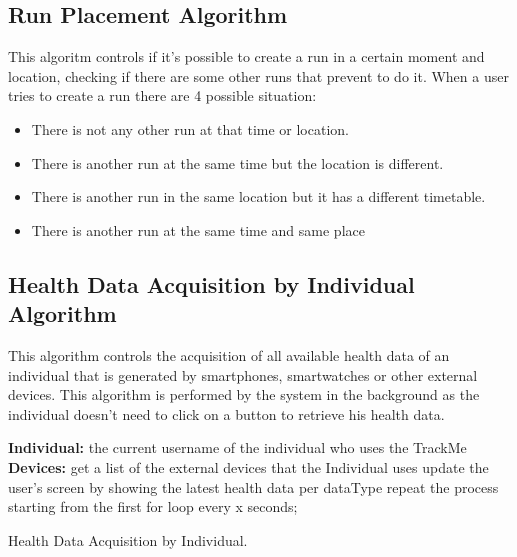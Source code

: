 \documentclass[12pt]{article}
\begin{document}
\subsection{Run Placement Algorithm}
This algoritm controls if it's possible to create a run in a certain moment and location, checking if there
are some other runs that prevent to do it. 
When a user tries to create a run there are 4 possible situation:
\begin{itemize}
    \item There is not any other run at that time or location. 
    \item There is another run at the same time but the location is different. 
    \item There is another run in the same location but it has a different timetable. 
    \item There is another run at the same time and same place 
\end{itemize}


\subsection{Health Data Acquisition by Individual Algorithm}

This algorithm controls the acquisition of all available health data of an individual that is generated by 
smartphones, smartwatches or other external devices. This algorithm is performed by the system in the 
background as the individual doesn't need to click on a button to retrieve his health data.
\vspace{10mm}

\begin{algorithm}[H]
 \textbf{Individual:} the current username of the individual who uses the TrackMe\;
 \noindent \textbf{Devices:} get a list of the external devices that the Individual uses\;
 \noindent {}
 \noindent {}
    update the user's screen by showing the latest health data per dataType\;\vspace{1mm}
    repeat the process starting from the first for loop every x seconds;
 \vspace{5mm}
 \caption{Health Data Acquisition by Individual.}
\end{algorithm}
\end{document}
